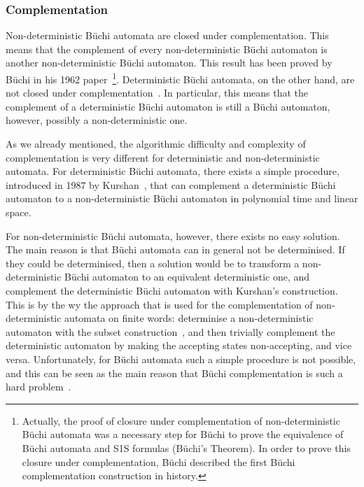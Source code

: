 

\subsubsection{Complementation}
Non-deterministic Büchi automata are closed under complementation. This means that the complement of every non-deterministic Büchi automaton is another non-deterministic Büchi automaton. This result has been proved by Büchi in his 1962 paper~\cite{buchi1960decision}\footnote{Actually, the proof of closure under complementation of non-deterministic Büchi automata was a necessary step for Büchi to prove the equivalence of Büchi automata and S1S formulas (Büchi's Theorem). In order to prove this closure under complementation, Büchi described the first Büchi complementation construction in history.}. Deterministic Büchi automata, on the other hand, are not closed under complementation~\cite{Thomas:1991}. In particular, this means that the complement of a deterministic Büchi automaton is still a Büchi automaton, however, possibly a non-deterministic one.

As we already mentioned, the algorithmic difficulty and complexity of complementation is very different for deterministic and non-deterministic automata. For deterministic Büchi automata, there exists a simple procedure, introduced in 1987 by Kurshan~\cite{Kurshan198759}, that can complement a deterministic Büchi automaton to a non-deterministic Büchi automaton in polynomial time and linear space.

For non-deterministic Büchi automata, however, there exists no easy solution. The main reason is that Büchi automata can in general not be determinised. If they could be determinised, then a solution would be to transform a non-deterministic Büchi automaton to an equivalent deterministic one, and complement the deterministic Büchi automaton with Kurshan's construction. This is by the wy the approach that is used for the complementation of non-deterministic automata on finite words: determinise a non-deterministic automaton with the subset construction~\cite{1959_rabin}, and then trivially complement the deterministic automaton by making the accepting states non-accepting, and vice versa. Unfortunately, for Büchi automata such a simple procedure is not possible, and this can be seen as the main reason that Büchi complementation is such a hard problem~\cite{niessner1997deterministic}.

